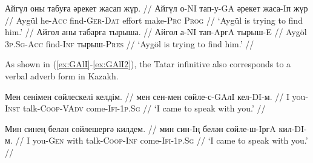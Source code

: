 \documentclass[a4paper,11pt]{article}
\newcommand{\gmk}[1]{{\qipb\scshape #1}}
\newcommand{\eng}[1]{`#1'}
\begin{document}

\pex[everygla=,everyglb=,everyglc=\small,aboveglbskip=0pt,aboveglftskip=0ex]  %
\vspace{-1.5ex}
\label{ex:try}
\begingl
\gla Айгүл оны табуға әрекет жасап жүр. //
\glb Айгүл о-NI тап-у-GA әрекет жаса-Iп жүр //
\glc Aygül he-\gmk{Acc} find-\gmk{Ger}-\gmk{Dat} effort make-\gmk{Prc} \gmk{Prog} //
\glft \eng{Aygül is trying to find him.} //
\endgl
\xe
\pex[everygla=,everyglb=,everyglc=,aboveglbskip=0pt,aboveglftskip=0ex]  %
\vspace{-1.5ex}
\begingl
\gla Айгөл аны табарга тырыша. //
\glb Айгөл а-NI тап-AргA тырыш-E //
\glb Aygöl \gmk{3p.Sg}-\gmk{Acc} find-\gmk{Inf} тырыш-\gmk{Pres} //
\glft \eng{Aygöl is trying to find him.} //
\endgl
\xe

\vspace{0.8ex}

As shown in (\ref{ex:GAlI}-\ref{ex:GAlI2}), the Tatar infinitive also corresponds to a verbal adverb form in Kazakh.

\vspace{-1ex}

\pex[everygla=,everyglb=,everyglc=,aboveglbskip=0pt,aboveglftskip=0ex]  %
\vspace{-1ex}
\label{ex:GAlI}
\begingl
\gla Мен сенімен сөйлескелі келдім. //
\glb мен сен-мен сөйле-с-GAлI кел-DI-м. //
\glb I you-\gmk{Inst} talk-\gmk{Coop}-\gmk{VAdv} come-\gmk{Ifi}-\gmk{1p.Sg} //
\glft \eng{I came to speak with you.} //
\endgl
\xe


\pex[everygla=,everyglb=,everyglc=\small,aboveglbskip=0pt,aboveglftskip=0ex]  %
\vspace{-1ex}
\label{ex:GAlI2}
\begingl
\gla Мин синең белән сөйлешергә килдем. //
\glb мин син-Iң белән сөйле-ш-IргA кил-DI-м. //
\glc I you-\gmk{Gen} with talk-\gmk{Coop}-\gmk{Inf} come-\gmk{Ifi}-\gmk{1p.Sg} //
\glft \eng{I came to speak with you.} //
\endgl
\xe
\end{document}
